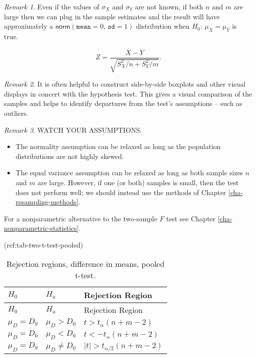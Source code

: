\documentclass[]{book}
\providecommand{\tightlist}{%
  \setlength{\itemsep}{0pt}\setlength{\parskip}{0pt}}
\numberwithin{equation}{chapter}
\numberwithin{figure}{chapter}
\theoremstyle{plain}
\theoremstyle{definition}
\theoremstyle{remark}
\theoremstyle{definition}
\theoremstyle{definition}
\theoremstyle{remark}
\newtheorem*{remark}{Remark}
\begin{document}
\bigskip

\begin{remark}
Even if the values of \(\sigma_{X}\) and \(\sigma_{Y}\) are not known,
if both \(n\) and \(m\) are large then we can plug in the sample
estimates and the result will have approximately a
\(\mathsf{norm}(\mathtt{mean} = 0,\,\mathtt{sd} = 1)\) distribution when
\(H_{0}:\,\mu_{X} = \mu_{Y}\) is true.

\begin{equation} 
Z = \frac{\overline{X} - \overline{Y}}{\sqrt{S_{X}^{2}/n + S_{Y}^{2}/m}}.
\end{equation}
\end{remark}

\bigskip

\begin{remark}
It is often helpful to construct side-by-side boxplots and other visual
displays in concert with the hypothesis test. This gives a visual
comparison of the samples and helps to identify departures from the
test's assumptions -- such as outliers.
\end{remark}

\bigskip

\begin{remark}
WATCH YOUR ASSUMPTIONS.

\begin{itemize}
\tightlist
\item
  The normality assumption can be relaxed as long as the population
  distributions are not highly skewed.
\item
  The equal variance assumption can be relaxed as long as both sample
  sizes \(n\) and \(m\) are large. However, if one (or both) samples is
  small, then the test does not perform well; we should instead use the
  methods of Chapter \ref{cha-resampling-methods}.
\end{itemize}
\end{remark}

For a nonparametric alternative to the two-sample \(F\) test see Chapter
\ref{cha-nonparametric-statistics}.

(ref:tab-two-t-test-pooled)

\begin{longtable}[]{@{}lll@{}}
\caption{Rejection regions, difference in means, pooled
t-test.}\tabularnewline
\toprule
\(H_{0}\) & \(H_{a}\) & Rejection Region\tabularnewline
\midrule
\endfirsthead
\toprule
\(H_{0}\) & \(H_{a}\) & Rejection Region\tabularnewline
\midrule
\endhead
\(\mu_{D} = D_{0}\) & \(\mu_{D} > D_{0}\) &
\(t > t_{\alpha}(n + m - 2)\)\tabularnewline
\(\mu_{D} = D_{0}\) & \(\mu_{D} < D_{0}\) &
\(t < -t_{\alpha}(n + m - 2)\)\tabularnewline
\(\mu_{D} = D_{0}\) & \(\mu_{D} \neq D_{0}\) &
\(\vert t \vert > t_{\alpha/2}(n + m - 2)\)\tabularnewline
\bottomrule
\end{longtable}
\end{document}
